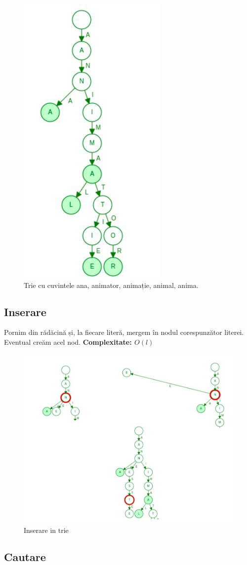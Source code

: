 \documentclass[11pt,a4paper]{article}
\theoremstyle{definition}
\theoremstyle{plain}
\theoremstyle{remark}
\begin{document}
\begin{figure}[H]
    \centering
    \includegraphics[width=0.3\linewidth]{trie.png}
    \caption{Trie cu cuvintele ana, animator, animație, animal, anima.}
    \label{fig:enter-label}
\end{figure}

\subsection*{Inserare}
Pornim din rădăcină și, la ﬁecare literă, mergem în nodul corespunzător literei. Eventual creăm acel nod. \textbf{Complexitate: $O(l)$}

\begin{figure}[H]
    \centering
    \includegraphics[width=0.75\linewidth]{insert-trie.png}
    \caption{Inserare in trie}
    \label{fig:enter-label}
\end{figure}

\subsection*{Cautare}
\end{document}

